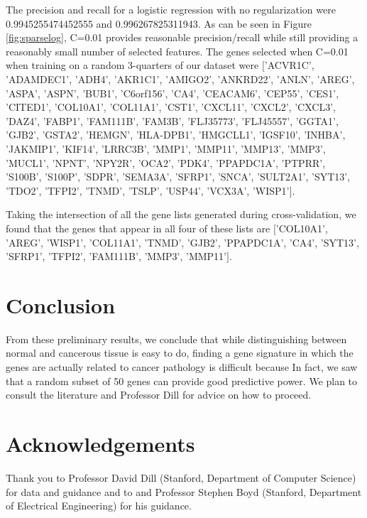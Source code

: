 \documentclass[11pt]{article}
\begin{document}
The precision and recall for a logistic regression with no regularization were 0.9945255474452555 and 0.996267825311943. As can be seen in Figure \ref{fig:sparselog}, C=0.01 provides reasonable precision/recall while still providing a reasonably small number of selected features. The genes selected when C=0.01 when training on a random 3-quarters of our dataset were $[$'ACVR1C', 'ADAMDEC1', 'ADH4', 'AKR1C1', 'AMIGO2', 'ANKRD22', 'ANLN', 'AREG', 'ASPA', 'ASPN', 'BUB1', 'C6orf156', 'CA4', 'CEACAM6', 'CEP55', 'CES1', 'CITED1', 'COL10A1', 'COL11A1', 'CST1', 'CXCL11', 'CXCL2', 'CXCL3', 'DAZ4', 'FABP1', 'FAM111B', 'FAM3B', 'FLJ35773', 'FLJ45557', 'GGTA1', 'GJB2', 'GSTA2', 'HEMGN', 'HLA-DPB1', 'HMGCLL1', 'IGSF10', 'INHBA', 'JAKMIP1', 'KIF14', 'LRRC3B', 'MMP1', 'MMP11', 'MMP13', 'MMP3', 'MUCL1', 'NPNT', 'NPY2R', 'OCA2', 'PDK4', 'PPAPDC1A', 'PTPRR', 'S100B', 'S100P', 'SDPR', 'SEMA3A', 'SFRP1', 'SNCA', 'SULT2A1', 'SYT13', 'TDO2', 'TFPI2', 'TNMD', 'TSLP', 'USP44', 'VCX3A', 'WISP1'$]$.

Taking the intersection of all the gene lists generated during cross-validation, we found that the genes that appear in all four of these lists are $[$'COL10A1', 'AREG', 'WISP1', 'COL11A1', 'TNMD', 'GJB2', 'PPAPDC1A', 'CA4', 'SYT13', 'SFRP1', 'TFPI2', 'FAM111B', 'MMP3', 'MMP11'$]$.

\section{Conclusion}
From these preliminary results, we conclude that while distinguishing between normal and cancerous tissue is easy to do, finding a gene signature in which the genes are actually related to cancer pathology is difficult because In fact, we saw that a random subset of 50 genes can provide good predictive power. We plan to consult the literature and Professor Dill for advice on how to proceed. 

\section{Acknowledgements}
Thank you to Professor David Dill (Stanford, Department of Computer Science) for data and guidance and to and Professor Stephen Boyd (Stanford, Department of Electrical Engineering) for his guidance.
\end{document}
